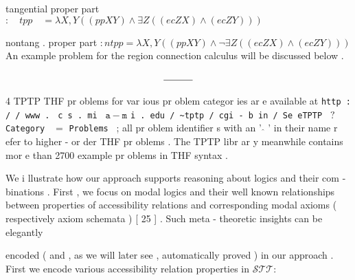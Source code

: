 \documentclass[10pt]{article}
\begin{document}
\noindent tangential proper part  $ :  \quad  tpp  \quad  =   \lambda  X  ,   Y   (  (  pp   X   Y  )   \wedge   \exists  Z   (  (  ec   Z   X  )   \wedge   (  ec   Z   Y  )  )  ) $  

nontang . proper part  $ :   ntpp   =   \lambda  X  ,   Y   (  (  pp   X   Y  )   \wedge   \neg  \exists  Z   (  (  ec   Z   X  )   \wedge   (  ec   Z   Y  )  )  ) $  
 An example problem for the region connection calculus will be discussed below . 

\begin{align*}
 \rule{3em}{0.4pt} 
\end{align*}

{\scriptsize 4 } {\small TPTP THF pr oblems for var ious pr oblem categor ies ar e available at \texttt{http : / / www . } } 
 {\small \texttt{c s . mi } }  $ \mathtt{a-m} $  {\small \texttt{i . edu / \textasciitilde tptp / cgi - b in / Se eTPTP } }  $ ? $  {\small \texttt{Category } }  $ = $  {\small \texttt{Problems } ; all pr oblem identifier s } 
 {\small with an ' }  $ \hat{} $  {\small ' in their name r efer to higher - or der THF pr oblems . The TPTP libr ar y } 
 {\small meanwhile contains mor e than 2700 example pr oblems in THF syntax . } 


\newpage
{}  

\noindent We i llustrate how our approach supports reasoning about logics and their com - 
 binations . First , we focus on modal logics and their well known relationships 
 between properties of accessibility relations and corresponding modal axioms 
 ( respectively axiom schemata ) [ 25 ] . Such meta - theoretic insights can be elegantly 

\noindent encoded ( and , as we will later see , automatically proved ) in our approach . First 
 we encode various accessibility relation properties in  $ \mathcal{STT}  : $  
\end{document}
